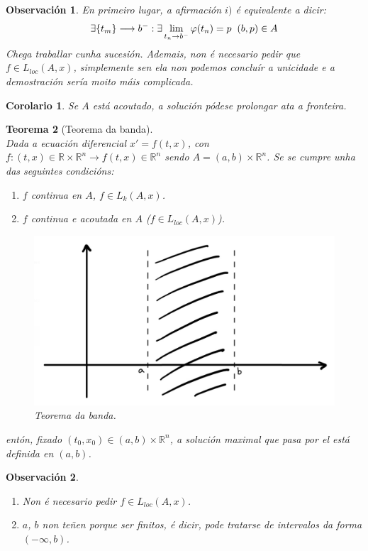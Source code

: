 \documentclass[11pt, a4paper,twoside]{article}
\theoremstyle{theorem-style}  %
\newtheorem{theorem}{Teorema}[section]  %
\newtheorem{corollary}[theorem]{Corolario} %
\theoremstyle{definition-style}
\newtheorem*{observation}{Observación} %
\theoremstyle{example-style}
\begin{document}
\begin{observation}
	En primeiro lugar, a afirmación $i)$ é equivalente a dicir:
	\[\exists \{t_m\} \longrightarrow b^- : \exists \lim\limits_{t_n \to b^-} \varphi(t_n) = p \hspace{0.2cm} (b, p) \in A\]
	Chega traballar cunha sucesión. Ademais, non é necesario pedir que $f \in L_{loc}(A, x)$, simplemente sen ela non podemos concluír a unicidade e a demostración sería moito máis complicada.
\end{observation}
\begin{corollary}
	Se $A$ está acoutado, a solución pódese prolongar ata a fronteira.
\end{corollary}
\begin{theorem}[Teorema da banda]\label{banda} \ \\ 
	Dada a ecuación diferencial $x' = f(t, x)$, con $f: (t, x) \in \mathbb{R} \times \mathbb{R}^n \longrightarrow f(t, x) \in \mathbb{R}^n$ sendo $A = (a, b) \times \mathbb{R}^n$. Se se cumpre unha das seguintes condicións:
	\begin{enumerate}
		\item  $f$ continua en $A$, $f \in L_k (A, x)$.
		\item  $f$ continua e acoutada en $A$ ($f \in L_{loc} (A, x)$).
	\end{enumerate}
	
	\begin{figure}[h]
		\centering
		\includegraphics[scale=0.3]{banda}
		\caption{Teorema da banda.}
	\end{figure}
	
	entón, fixado $(t_0, x_0) \in (a, b) \times \mathbb{R}^n$, a solución maximal que pasa por el está definida en $(a, b)$.
\end{theorem}
\begin{observation} \ 
	\begin{enumerate}
		\item Non é necesario pedir $f \in L_{loc} (A, x)$.
		\item $a$, $b$ non teñen porque ser finitos, é dicir, pode tratarse de intervalos da forma $(- \infty, b)$.
	\end{enumerate}
\end{observation}
\end{document}
